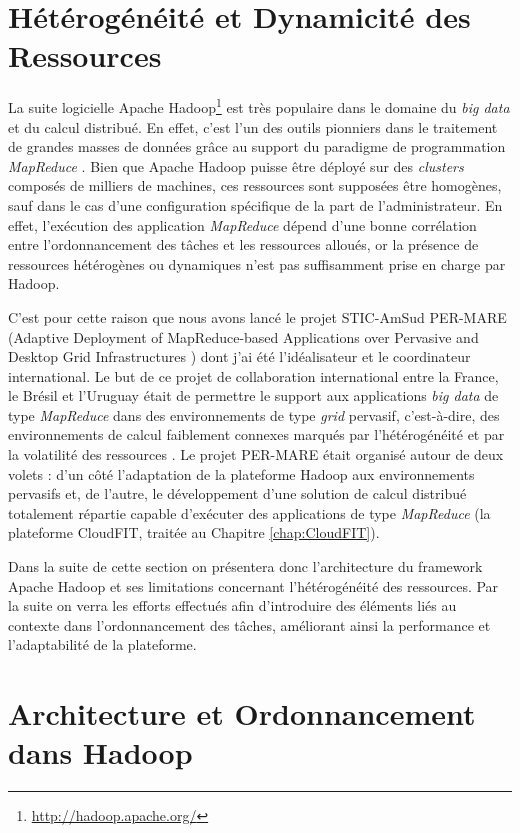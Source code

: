 \section{Hétérogénéité et Dynamicité des Ressources} \label{sec:Guilherme}

La suite logicielle Apache Hadoop\footnote{\url{http://hadoop.apache.org/}} est très populaire dans le domaine du \textit{big data} et du calcul distribué. En effet, c'est l'un des outils pionniers dans le traitement de grandes masses de données grâce au support du paradigme de programmation \textit{MapReduce} \cite{Dean2008}. Bien que Apache Hadoop puisse être déployé sur des \textit{clusters} composés de milliers de machines, ces ressources sont supposées être homogènes, sauf dans le cas d'une configuration spécifique de la part de l'administrateur. En effet, l'exécution des application \textit{MapReduce} dépend d'une bonne corrélation entre l'ordonnancement des tâches et les ressources alloués, or la présence de ressources hétérogènes ou dynamiques n'est pas suffisamment prise en charge par Hadoop. 

C'est pour cette raison que nous avons lancé le projet STIC-AmSud PER-MARE (Adaptive Deployment of MapReduce-based Applications over Pervasive and Desktop Grid Infrastructures \cite{PER-MARE}) dont j'ai été l'idéalisateur et le coordinateur international. Le but de ce projet de collaboration international entre la France, le Brésil et l'Uruguay était de permettre le support aux applications \textit{big data} de type \textit{MapReduce} dans des environnements de type \textit{grid} pervasif, c'est-à-dire, des environnements de calcul faiblement connexes marqués par l'hétérogénéité et par la volatilité des ressources \cite{3PGCIC}. Le projet PER-MARE était organisé autour de deux volets : d'un côté l'adaptation de la plateforme Hadoop aux environnements pervasifs et, de l'autre, le développement d'une solution de calcul distribué totalement répartie capable d'exécuter des applications de type \textit{MapReduce} (la plateforme CloudFIT, traitée au Chapitre \ref{chap:CloudFIT}).
 
Dans la suite de cette section on présentera donc l'architecture du framework Apache Hadoop et ses limitations concernant l'hétérogénéité des ressources. Par la suite on verra les efforts effectués afin d'introduire des éléments liés au contexte dans l'ordonnancement des tâches, améliorant ainsi la performance et l'adaptabilité de la plateforme. 



\section{Architecture et Ordonnancement dans Hadoop \label{subsec:ordoHadoop}}

